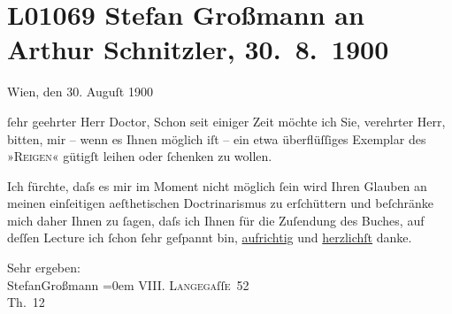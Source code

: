 

\section[Stefan Großmann an Arthur Schnitzler, 30. 8. 1900]{L01069 Stefan Großmann an Arthur Schnitzler, 30. 8. 1900}
\nopagebreak{}
\rehead{ }\normalsize\beginnumbering{}
\toendnotes[C]{\smallbreak\pagebreak[2]}
\pstart
           \raggedleft{}{\pb}Wien, den 30. Auguſt 1900\pend
           
\pstart{}ſehr geehrter Herr Doctor,\pend\vspace{0.5em}
\pstart
           Schon seit einiger Zeit möchte ich Sie, verehrter Herr, bitten, mir – wenn es Ihnen
               möglich iſt – ein \introOben{}etwa\introOben{} überflüſſiges Exemplar des »\textsc{Reigen}« gütigſt leihen oder ſchenken zu wollen.\pend
           
\pstart
           Ich fürchte, daſs es mir im Moment nicht möglich ſein wird Ihren Glauben an meinen
               einſeitigen aeſthetischen Doctrinarismus zu erſchüttern und beſchränke mich daher
               Ihnen zu ſagen, daſs ich Ihnen für die Zuſendung des Buches, {\pb}auf deſſen Lecture ich ſchon ſehr geſpannt
               bin, \uline{aufrichtig} und \uline{herzlichſt} danke.\pend
           
\pstart
           Sehr ergeben:{\\[\baselineskip]}\spacefill\mbox{StefanGroßmann}\pend
           \leftskip=0em{}
\pstart
           \noindent{}\raggedleft{}VIII. \textsc{Langega}ſſ\textsc{e} 52{\\}Th. 12\pend
           \endnumbering{}  
      